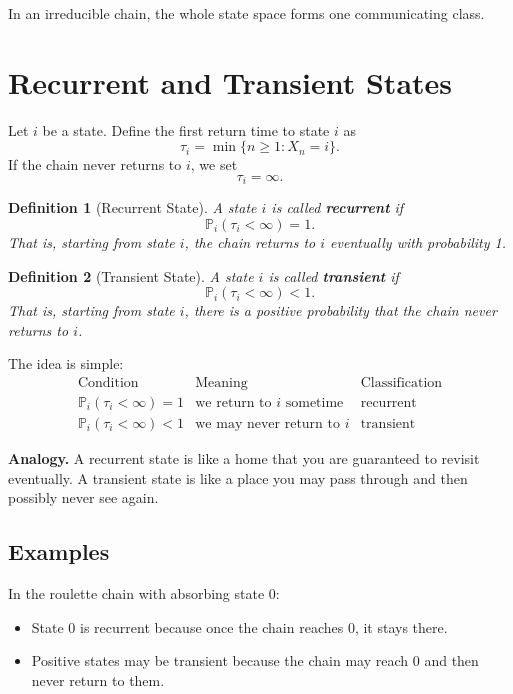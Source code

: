 \documentclass[12pt,a4paper]{article}
\theoremstyle{lecturestyle}
\newtheorem{definition}{Definition}
\newcommand{\Prob}{\mathbb{P}}
\begin{document}
In an irreducible chain, the whole state space forms one communicating class.

\section{Recurrent and Transient States}

Let $i$ be a state. Define the first return time to state $i$ as
\[
\tau_i=\min\{n\geq 1:X_n=i\}.
\]
If the chain never returns to $i$, we set
\[
\tau_i=\infty.
\]

\begin{definition}[Recurrent State]
A state $i$ is called \textbf{recurrent} if
\[
\Prob_i(\tau_i<\infty)=1.
\]
That is, starting from state $i$, the chain returns to $i$ eventually with probability 1.
\end{definition}

\begin{definition}[Transient State]
A state $i$ is called \textbf{transient} if
\[
\Prob_i(\tau_i<\infty)<1.
\]
That is, starting from state $i$, there is a positive probability that the chain never returns to $i$.
\end{definition}

The idea is simple:
\[
\begin{array}{c|c|c}
\text{Condition} & \text{Meaning} & \text{Classification}\\
\hline
\Prob_i(\tau_i<\infty)=1 & \text{we return to }i\text{ sometime} & \text{recurrent}\\
\Prob_i(\tau_i<\infty)<1 & \text{we may never return to }i & \text{transient}
\end{array}
\]

\textbf{Analogy.} A recurrent state is like a home that you are guaranteed to revisit eventually. A transient state is like a place you may pass through and then possibly never see again.

\subsection{Examples}

In the roulette chain with absorbing state $0$:
\begin{itemize}[leftmargin=1.2cm]
    \item State $0$ is recurrent because once the chain reaches $0$, it stays there.
    \item Positive states may be transient because the chain may reach $0$ and then never return to them.
\end{itemize}
\end{document}
